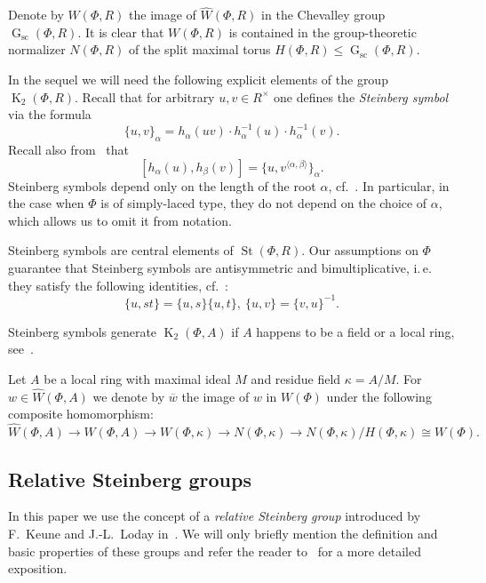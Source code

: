 \documentclass[oneside, 10pt]{amsart}
\DeclareMathOperator{\St}{St}
\DeclareMathOperator{\G}{G}
\newcommand{\Gsc}{\G_\mathrm{sc}}
\DeclareMathOperator{\K}{K}
\newcommand{\StW}{\widehat{W}}
\numberwithin{equation}{section}
\numberwithin{thm}{section}
\numberwithin{lemma}{section}
\theoremstyle{definition}
\theoremstyle{remark}
\begin{document}
Denote by $W(\Phi, R)$ the image of $\StW(\Phi, R)$ in the Chevalley group $\Gsc(\Phi, R)$.
It is clear that $W(\Phi, R)$ is contained in the group-theoretic normalizer $N(\Phi, R)$ of the split maximal torus $H(\Phi, R) \leq \Gsc(\Phi, R)$.

In the sequel we will need the following explicit elements of the group $\K_2(\Phi, R)$.
Recall that for arbitrary $u, v \in R^\times$ one defines the \textit{Steinberg symbol} via the formula
\begin{equation} \label{eq:steinberg} \{ u, v \}_\alpha = h_\alpha(uv) \cdot h_\alpha^{-1}(u) \cdot h_\alpha^{-1}(v). \end{equation}
Recall also from~\cite[Lemme~5.4]{Ma69} that
\begin{equation} \label{eq:steinberg-2} [h_\alpha(u), h_\beta(v)] = \{u, v^{\langle \alpha, \beta \rangle}\}_\alpha. \end{equation}
Steinberg symbols depend only on the length of the root $\alpha$, cf.~\cite[pp.~26--28]{Ma69}.
In particular, in the case when $\Phi$ is of simply-laced type, they do not depend on the choice of $\alpha$, which allows us to omit it from notation.

Steinberg symbols are central elements of $\St(\Phi, R)$.
Our assumptions on $\Phi$ guarantee that Steinberg symbols are antisymmetric and bimultiplicative, i.\,e. they satisfy the following identities, cf.~\cite[Lemme~2.4]{Ma69}:
\begin{equation} \label{eq:symbol-properties} \{ u, st \} = \{ u, s\} \{ u, t \}, \ \{ u, v \} = \{ v, u\}^{-1}. \end{equation}

Steinberg symbols generate $\K_2(\Phi, A)$ if $A$ happens to be a field or a local ring, see~\cite[Theorem~2.13]{Ste73}.

Let $A$ be a local ring with maximal ideal $M$ and residue field $\kappa = A/M$.
For $w \in \StW(\Phi, A)$ we denote by $\overline{w}$ the image of $w$ in $W(\Phi)$ under the following composite homomorphism:
\begin{equation} \label{eq:projection} \StW(\Phi, A) \to W(\Phi, A) \to W(\Phi, \kappa) \to N(\Phi, \kappa) \to N(\Phi, \kappa) / H(\Phi, \kappa) \cong W(\Phi). \end{equation}

\subsection{Relative Steinberg groups} \label{subsec:another-presentation}
In this paper we use the concept of a \textit{relative Steinberg group} introduced by F.~Keune and J.-L.~Loday in~\cite{Ke78, Lo78}.
We will only briefly mention the definition and basic properties of these groups and refer the reader to~\cite[\S~2.3]{LS20} for a more detailed exposition.
\end{document}
